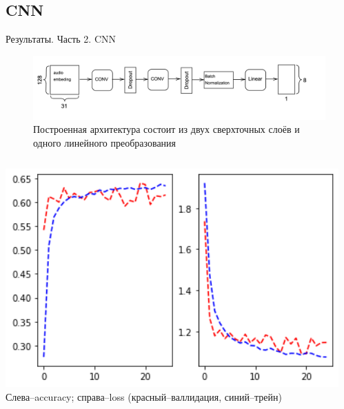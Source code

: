 \documentclass[c, aspectratio = 43]{beamer}
\begin{document}
              \subsection{CNN}          
            \begin{frame}{Результаты. Часть 2. CNN}
                \begin{figure}[h]
                	\includegraphics[width=1\linewidth]{CNN.png}
                	Построенная архитектура состоит из двух сверхточных слоёв и одного линейного преобразования
                \end{figure}
            
            \begin{columns}
            
             \begin{column}{0.5\textwidth}  %
                
                
                    \begin{center}
                     \includegraphics[width=1\textwidth]{CNN_testandval.png}
                    \tiny Слева--accuracy; справа--loss (красный--валлидация, синий--трейн)
                     \end{center}
                \end{column}
                \begin{column}{0.5\textwidth}
                   

\end{column}
\end{columns}
\end{frame}
\end{document}

